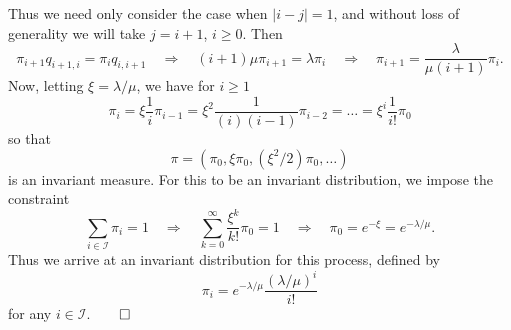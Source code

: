 \documentclass[11pt, letterpaper]{article}
\newcommand{\mc}[1]{\mathcal{#1}}
\begin{document}
    Thus we need only consider the case when $|i-j|=1$, and without loss of generality we will take $j=i+1$, $i\geq 0$. Then
    \[\pi_{i+1}q_{i+1,i}=\pi_iq_{i,i+1}\quad\Rightarrow\quad (i+1)\mu\pi_{i+1}=\lambda \pi_i\quad\Rightarrow\quad\pi_{i+1}=\frac{\lambda}{\mu(i+1)}\pi_i.\]
    Now, letting $\xi=\lambda/\mu$, we have for $i\geq 1$
    \[\pi_i=\xi\frac{1}{i}\pi_{i-1}=\xi^2\frac{1}{(i)(i-1)}\pi_{i-2}=\dots=\xi^i\frac{1}{i!}\pi_0\]
    so that
    \[\pi=(\pi_0,\xi\pi_0,(\xi^2/2)\pi_0,\dots)\]
    is an invariant measure. For this to be an invariant distribution, we impose the constraint
    \[\sum_{i\in\mc{I}}\pi_i=1\quad\Rightarrow\quad\sum_{k=0}^\infty\frac{\xi^k}{k!}\pi_0=1\quad\Rightarrow\quad\pi_0=e^{-\xi}=e^{-\lambda/\mu}.\]
    Thus we arrive at an invariant distribution for this process, defined by
    \[\pi_i=e^{-\lambda/\mu}\frac{(\lambda/\mu)^i}{i!}\]
    for any $i\in\mc{I}$.\hfill{$\qed$}
\end{document}
